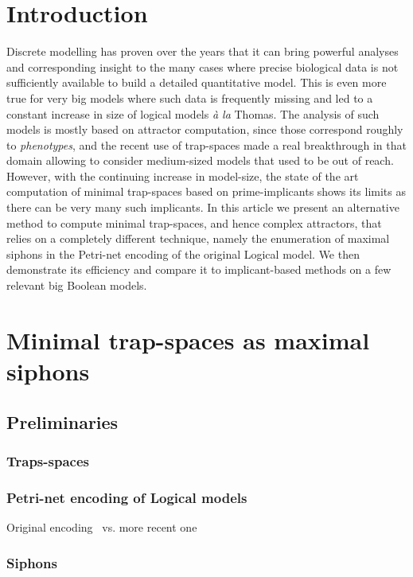 \documentclass[runningheads]{llncs}
\begin{document}
\section{Introduction}

Discrete modelling has proven over the years that it can bring powerful analyses and corresponding insight to the many cases where precise biological data is not sufficiently available to build a detailed quantitative model.
This is even more true for very big models where such data is frequently missing and led to a constant increase in size of logical models \emph{à la} Thomas.
The analysis of such models is mostly based on attractor computation, since those correspond roughly to \emph{phenotypes}, and the recent use of trap-spaces made a real breakthrough in that domain allowing to consider medium-sized models that used to be out of reach.
However, with the continuing increase in model-size, the state of the art computation of minimal trap-spaces based on prime-implicants shows its limits as there can be very many such implicants.
In this article we present an alternative method to compute minimal trap-spaces, and hence complex attractors, that relies on a completely different technique, namely the enumeration of maximal siphons in the Petri-net encoding of the original Logical model.
We then demonstrate its efficiency and compare it to implicant-based methods on a few relevant big Boolean models.

\section{Minimal trap-spaces as maximal siphons}
\subsection{Preliminaries}
\subsubsection{Traps-spaces}
\subsubsection{Petri-net encoding of Logical models}

Original encoding~\cite{chaouiya2011petri} vs. more recent one~\cite{chatain2014characterization}

\subsubsection{Siphons}
\end{document}
